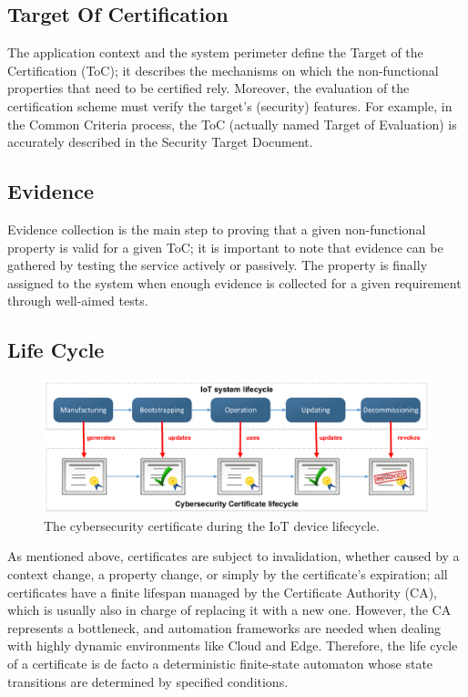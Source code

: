 \subsection{Target Of Certification}
The application context and the system perimeter define the Target of the Certification (ToC); it describes the mechanisms on which the non-functional properties that need to be certified rely. Moreover, the evaluation of the certification scheme must verify the target’s (security) features. For example, in the Common Criteria process, the ToC (actually named Target of Evaluation) is accurately described in the Security Target Document.

\subsection{Evidence}
Evidence collection is the main step to proving that a given non-functional property is valid for a given ToC; it is important to note that evidence can be gathered by testing the service actively or passively. 
The property is finally assigned to the system when enough evidence is collected for a given requirement through well-aimed tests. 


\subsection{Life Cycle}
\begin{figure}[hb]
    \centering
    \includegraphics[scale=0.5]{images/lifeCycle.png}
    \caption{The cybersecurity certificate during the IoT device lifecycle.}
    \label{fig:lifecycle}
\end{figure}
As mentioned above, certificates are subject to invalidation, whether caused by a context change, a property change, or simply by the certificate's expiration; all certificates have a finite lifespan managed by the Certificate Authority (CA), which is usually also in charge of replacing it with a new one. However, the CA represents a bottleneck, and automation frameworks are needed when dealing with highly dynamic environments like Cloud and Edge. Therefore, the life cycle of a certificate is de facto a deterministic finite-state automaton whose state transitions are determined by specified conditions.

